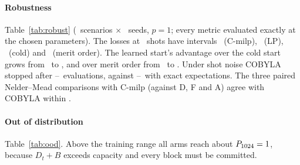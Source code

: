 \documentclass[10pt,conference]{IEEEtran}
\newcommand{\fitcol}[1]{\sbox0{#1}\ifdim\wd0>\columnwidth\resizebox{\columnwidth}{!}{\usebox0}\else\usebox0\fi}
\begin{document}
\begin{table}[t]
\centering
\caption{Wrong-pin census. Top: granularity axis at $T=\NHoursMain$. Bottom: horizon axis at fixed granularity. LP per h: LP wrong pins per hour. GCN: C-milp trained at that horizon (not available at L3, L4). \NCensus\ paired draws per cell.}
\label{tab:size}
\scriptsize
\setlength{\tabcolsep}{2.5pt}
\fitcol{}
\end{table}

\paragraph{Robustness} Table~\ref{tab:robust} (\NScen\ scenarios $\times$ \NSeedsRobust\ seeds, $p=1$; every metric evaluated exactly at the chosen parameters). The losses at \ShotsMin\ shots have intervals \ShotLossCmilpCI\ (C-milp), \ShotLossDCI\ (LP), \ShotLossACI\ (cold) and \ShotLossFCI\ (merit order). The learned start's advantage over the cold start grows from \ShotCmilpMinusAExact\ to \ShotCmilpMinusAOneTwoEight, and over merit order from \ShotCmilpMinusFExact\ to \ShotCmilpMinusFOneTwoEight. Under shot noise COBYLA stopped after \ShotEvalsMin--\ShotEvalsMax\ evaluations, against \ExactEvalsMin--\ExactEvalsMax\ with exact expectations. The three paired Nelder--Mead comparisons with C-milp (against D, F and A) agree with COBYLA within \NMMaxPairDiff.

\begin{table}[t]
\centering
\caption{Robustness: mean $P_{\KMax}$ under each optimiser view (L2, $p=1$, $\varepsilon=\EpsMain$, \NScen\ scenarios $\times$ \NSeedsRobust\ seeds; metrics exact at the chosen parameters). Evals: mean objective evaluations of C-milp's optimisation.}
\label{tab:robust}
\scriptsize
\setlength{\tabcolsep}{2.5pt}
\fitcol{}
\end{table}

\paragraph{Out of distribution} Table~\ref{tab:ood}. Above the training range all arms reach about $P_{1024}=1$, because $D_t+B$ exceeds capacity and every block must be committed.

\begin{table}[t]
\centering
\caption{Out of distribution: the unchanged L2 C-milp model vs.\ the LP (D) and the cold start (A), \OODNScen\ scenarios $\times$ \NSeedsOOD\ seeds per set, $p=1$, $\varepsilon=\EpsMain$. Wrong: wrongly pinned bits; columns C-milp, D, A: mean $P_{\KMax}$.}
\label{tab:ood}
\scriptsize
\setlength{\tabcolsep}{2pt}
\fitcol{}
\end{table}
\end{document}
